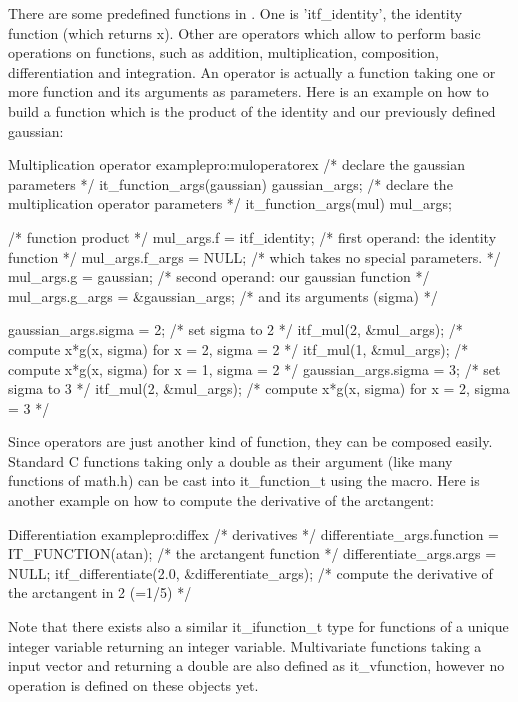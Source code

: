       There are some predefined functions in \libit. One is
      'itf\_identity', the identity function (which returns x). Other
      are operators which allow to perform basic operations on
      functions, such as addition, multiplication, composition,
      differentiation and integration. An operator is actually a
      function taking one or more function and its arguments as
      parameters. Here is an example on how to build a function which
      is the product of the identity and our previously defined
      gaussian:

\begin{program}{Multiplication operator example}{pro:muloperatorex}
/* declare the gaussian parameters */
it_function_args(gaussian) gaussian_args;
/* declare the multiplication operator parameters */
it_function_args(mul) mul_args;

/* function product */
mul_args.f = itf_identity; /* first operand: the identity function  */
mul_args.f_args = NULL;    /* which takes no special parameters.    */
mul_args.g = gaussian;     /* second operand: our gaussian function */
mul_args.g_args = &gaussian_args;  /* and its arguments (sigma) */

gaussian_args.sigma = 2;   /* set sigma to 2 */
itf_mul(2, &mul_args); /* compute x*g(x, sigma) for x = 2, sigma = 2 */
itf_mul(1, &mul_args); /* compute x*g(x, sigma) for x = 1, sigma = 2 */
gaussian_args.sigma = 3;   /* set sigma to 3 */
itf_mul(2, &mul_args); /* compute x*g(x, sigma) for x = 2, sigma = 3 */
\end{program}

      Since operators are just another kind of function, they can be
      composed easily. Standard C functions taking only a double as
      their argument (like many functions of math.h) can be cast into
      it\_function\_t using the  macro. Here is another
      example on how to compute the derivative of the arctangent:

\begin{program}{Differentiation example}{pro:diffex}
/* derivatives */
differentiate_args.function = IT_FUNCTION(atan); /* the arctangent function */
differentiate_args.args = NULL;
itf_differentiate(2.0, &differentiate_args); /* compute the derivative of
                                                 the arctangent in 2 (=1/5) */ 
\end{program}

      Note that there exists also a similar it\_ifunction\_t type for
      functions of a unique integer variable returning an integer
      variable. Multivariate functions taking a input vector and
      returning a double are also defined as it\_vfunction, however no
      operation is defined on these objects yet.


